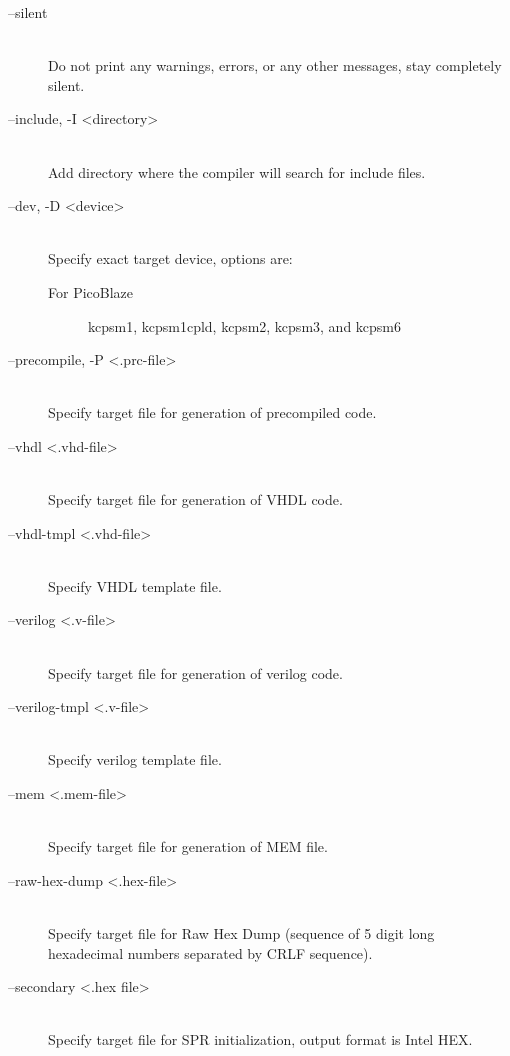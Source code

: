 \begin{description}
            \item[--silent]~\\
                Do not print any warnings, errors, or any other messages, stay completely silent.

            \item[--include, -I <directory>]~\\
                Add directory where the compiler will search for include files.

            \item[--dev, -D <device>]~\\
                Specify exact target device, options are:
                \begin{description}
                    \item[For PicoBlaze]
                        kcpsm1, kcpsm1cpld, kcpsm2, kcpsm3, and kcpsm6
                \end{description}

            \item[--precompile, -P <.prc-file>]~\\
                Specify target file for generation of precompiled code.

            \item[--vhdl <.vhd-file>]~\\
                Specify target file for generation of VHDL code.

            \item[--vhdl-tmpl <.vhd-file>]~\\
                Specify VHDL template file.

            \item[--verilog <.v-file>]~\\
                Specify target file for generation of verilog code.

            \item[--verilog-tmpl <.v-file>]~\\
                Specify verilog template file.

            \item[--mem <.mem-file>]~\\
                Specify target file for generation of MEM file.

            \item[--raw-hex-dump <.hex-file>]~\\
                Specify target file for Raw Hex Dump (sequence of 5 digit long hexadecimal numbers separated by CRLF sequence).

            \item[--secondary <.hex file>]~\\
                Specify target file for SPR initialization, output format is Intel HEX.
        \end{description}

